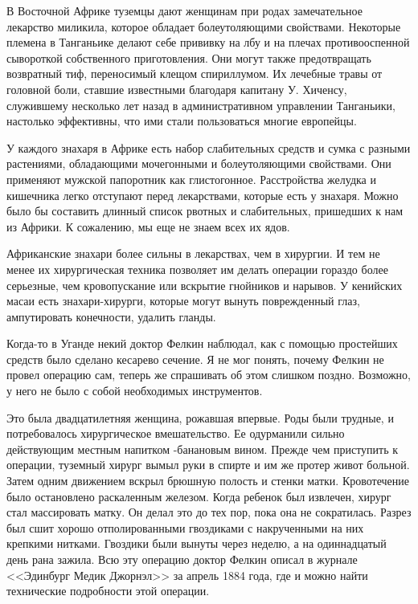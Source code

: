 \documentclass[12pt,a4paper,twoside,openany,svgnames]{memoir}
\begin{document}
В Восточной Африке туземцы дают женщинам при родах замечательное лекарство миликила, которое обладает болеутоляющими свойствами. Некоторые племена в Танганьике делают себе прививку на лбу и на плечах противооспенной сывороткой собственного приготовления. Они могут также предотвращать возвратный тиф, переносимый клещом спириллумом. Их лечебные травы от головной боли, ставшие известными благодаря капитану У. Хиченсу, служившему несколько лет назад в административном управлении Танганьики, настолько эффективны, что ими стали пользоваться многие европейцы.

У каждого знахаря в Африке есть набор слабительных средств и сумка с разными растениями, обладающими мочегонными и болеутоляющими свойствами. Они применяют мужской папоротник как глистогонное. Расстройства желудка и кишечника легко отступают перед лекарствами, которые есть у знахаря. Можно было бы составить длинный список рвотных и слабительных, пришедших к нам из Африки. К сожалению, мы еще не знаем всех их ядов.

Африканские знахари более сильны в лекарствах, чем в хирургии. И тем не менее их хирургическая техника позволяет им делать операции гораздо более серьезные, чем кровопускание или вскрытие гнойников и нарывов. У кенийских масаи есть знахари-хирурги, которые могут вынуть поврежденный глаз, ампутировать конечности, удалить гланды.

Когда-то в Уганде некий доктор Фелкин наблюдал, как с помощью простейших средств было сделано кесарево сечение. Я не мог понять, почему Фелкин не провел операцию сам, теперь же спрашивать об этом слишком поздно. Возможно, у него не было с собой необходимых инструментов.

Это была двадцатилетняя женщина, рожавшая впервые. Роды были трудные, и потребовалось хирургическое вмешательство. Ее одурманили сильно действующим местным напитком -банановым вином. Прежде чем приступить к операции, туземный хирург вымыл руки в спирте и им же протер живот больной. Затем одним движением вскрыл брюшную полость и стенки матки. Кровотечение было остановлено раскаленным железом. Когда ребенок был извлечен, хирург стал массировать матку. Он делал это до тех пор, пока она не сократилась. Разрез был сшит хорошо отполированными гвоздиками с накрученными на них крепкими нитками. Гвоздики были вынуты через неделю, а на одиннадцатый день рана зажила. Всю эту операцию доктор Фелкин описал в журнале <<Эдинбург Медик Джорнэл>> за апрель 1884 года, где и можно найти технические подробности этой операции.
\end{document}
